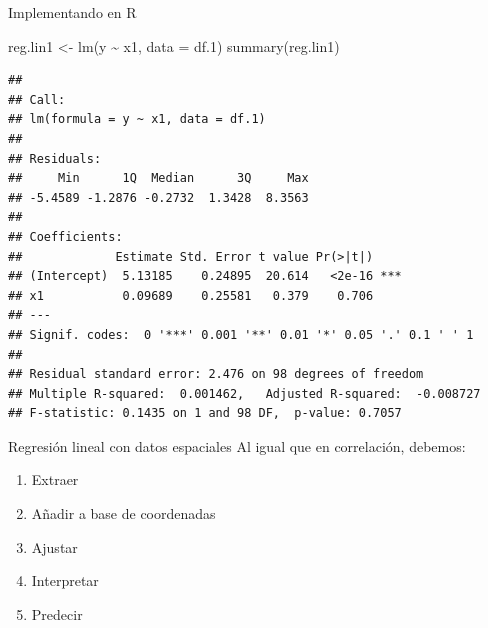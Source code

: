 \documentclass[
  11pt,
  ignorenonframetext,
]{beamer}
\newenvironment{Shaded}{}{}
\newcommand{\AttributeTok}[1]{\textcolor[rgb]{0.49,0.56,0.16}{#1}}
\newcommand{\FloatTok}[1]{\textcolor[rgb]{0.25,0.63,0.44}{#1}}
\newcommand{\FunctionTok}[1]{\textcolor[rgb]{0.02,0.16,0.49}{#1}}
\newcommand{\NormalTok}[1]{#1}
\newcommand{\OtherTok}[1]{\textcolor[rgb]{0.00,0.44,0.13}{#1}}
\newcommand{\SpecialCharTok}[1]{\textcolor[rgb]{0.25,0.44,0.63}{#1}}
\begin{document}
\begin{frame}[fragile]{Implementando en R}
\protect\hypertarget{implementando-en-r-3}{}
\begin{Shaded}
\begin{Highlighting}[]
\NormalTok{reg.lin1 }\OtherTok{\textless{}{-}} \FunctionTok{lm}\NormalTok{(y }\SpecialCharTok{\textasciitilde{}}\NormalTok{ x1, }\AttributeTok{data =}\NormalTok{ df}\FloatTok{.1}\NormalTok{)}
\FunctionTok{summary}\NormalTok{(reg.lin1)}
\end{Highlighting}
\end{Shaded}

\begin{verbatim}
## 
## Call:
## lm(formula = y ~ x1, data = df.1)
## 
## Residuals:
##     Min      1Q  Median      3Q     Max 
## -5.4589 -1.2876 -0.2732  1.3428  8.3563 
## 
## Coefficients:
##             Estimate Std. Error t value Pr(>|t|)    
## (Intercept)  5.13185    0.24895  20.614   <2e-16 ***
## x1           0.09689    0.25581   0.379    0.706    
## ---
## Signif. codes:  0 '***' 0.001 '**' 0.01 '*' 0.05 '.' 0.1 ' ' 1
## 
## Residual standard error: 2.476 on 98 degrees of freedom
## Multiple R-squared:  0.001462,   Adjusted R-squared:  -0.008727 
## F-statistic: 0.1435 on 1 and 98 DF,  p-value: 0.7057
\end{verbatim}
\end{frame}

\begin{frame}{Regresión lineal con datos espaciales}
\protect\hypertarget{regresiuxf3n-lineal-con-datos-espaciales}{}
Al igual que en correlación, debemos:

\begin{enumerate}
\item
  Extraer
\item
  Añadir a base de coordenadas
\item
  Ajustar
\item
  Interpretar
\item
  Predecir
\end{enumerate}
\end{frame}
\end{document}
